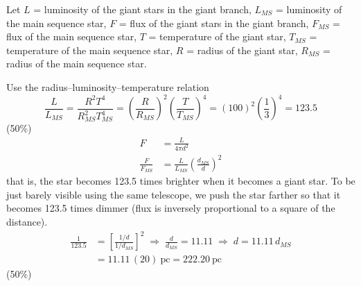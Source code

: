 Let $L$ = luminosity of the giant stars in the giant branch,
$L_{MS}$ = luminosity of the main sequence star,
$F$ = flux of the giant stars in the giant branch,
$F_{MS}$ = flux of the main sequence star,
$T$ = temperature of the giant star,
$T_{MS}$ = temperature of the main sequence star,
$R$ = radius of the giant star,
$R_{MS}$ = radius of the main sequence star.

Use the radius--luminosity--temperature relation
\[
  \frac{L}{L_{MS}} = \frac{R^2 T^4}{R_{MS}^2 T_{MS}^4}
    = \left(\frac{R}{R_{MS}}\right)^{\!2}\left(\frac{T}{T_{MS}}\right)^{\!4}
    = \left(100\right)^2 \left(\frac{1}{3}\right)^{\!4} = 123.5
\]
\hfill(50\%)
\begin{align*}
  F &= \frac{L}{4\pi d^2} \\
  \frac{F}{F_{MS}} &= \frac{L}{L_{MS}}\left(\frac{d_{MS}}{d}\right)^{\!2}
\end{align*}
that is, the star becomes 123.5 times brighter when it becomes a giant star. To
be just barely visible using the same telescope, we push the star farther so
that it becomes 123.5 times dimmer (flux is inversely proportional to a square
of the distance).
\begin{align*}
  \frac{1}{123.5} &= \left[\frac{1/d}{1/d_{MS}}\right]^{2}
  \;\Longrightarrow\; \frac{d}{d_{MS}} = 11.11
  \;\Longrightarrow\; d = 11.11\,d_{MS} \\
  &= 11.11\,(20)\ \text{pc} = 222.20\ \text{pc}
\end{align*}
\hfill(50\%)
